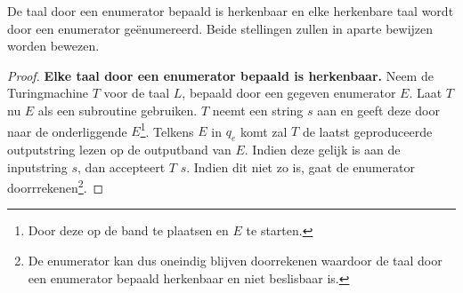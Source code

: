 \begin{theorem}
	De taal door een enumerator bepaald is herkenbaar en elke herkenbare taal wordt door een enumerator ge\"enumereerd. Beide stellingen zullen in aparte bewijzen worden bewezen.
\end{theorem}

\begin{proof}
	\textbf{Elke taal door een enumerator bepaald is herkenbaar.} Neem de Turingmachine $T$ voor de taal $L$, bepaald door een gegeven enumerator $E$. Laat $T$ nu $E$ als een subroutine gebruiken. $T$ neemt een string $s$ aan en geeft deze door naar de onderliggende $E$\footnote{Door deze op de band te plaatsen en $E$ te starten.}. Telkens $E$ in $q_e$ komt zal $T$ de laatst geproduceerde outputstring lezen op de outputband van $E$. Indien deze gelijk is aan de inputstring $s$, dan accepteert $T$ $s$. Indien dit niet zo is, gaat de enumerator doorrrekenen\footnote{De enumerator kan dus oneindig blijven doorrekenen waardoor de taal door een enumerator bepaald herkenbaar en niet beslisbaar is.}.
\end{proof}

